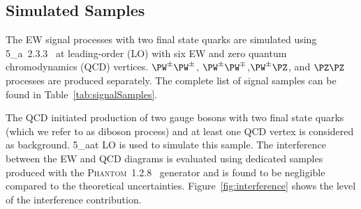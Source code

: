  
\subsection{Simulated Samples}
The EW signal processes with two final state quarks are simulated using \newline \MADGRAPH{}5\_a\MCATNLO~2.3.3~\cite{Alwall:2014} at leading-order (LO) with six EW and zero quantum chromodynamics (QCD) vertices. $\PW^{\pm}\PW^{\pm}$, $\PW^{\pm}\PW^{\mp}$,$\PW^{\pm}\PZ$, and $\PZ\PZ$ processes are produced separately. The complete list of signal samples can be found in Table~\ref{tab:signalSamples}.

The QCD initiated production of two gauge bosons with two final state quarks (which we refer to as diboson process) and at least one QCD vertex is considered as background. \MADGRAPH{}5\_a\MCATNLO at LO is used to simulate this sample. The interference between the EW and QCD diagrams is evaluated using dedicated samples produced with the \textsc{Phantom}~1.2.8~\cite{Ballestrero:2007xq} generator and is found to be negligible compared to the theoretical uncertainties. Figure~\ref{fig:interference} shows the level of the interference contribution. 

